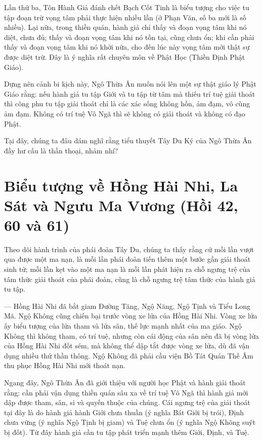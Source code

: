 Lần thứ ba, Tôn Hành Giả đánh chết Bạch Cốt Tinh là biểu tượng cho việc tu tập đoạn trừ vọng tâm phải thực hiện nhiều lần (ở Phạn Văn, số ba mới là số nhiều). Lại nữa, trong thiền quán, hành giả chỉ thấy và đoạn vọng tâm khi nó diệt, chưa đủ; thấy và đoạn vọng tâm khi nó tồn tại, cũng chưa ổn; khi cần phải thấy và đoạn vọng tâm khi nó khởi nữa, cho đến lúc này vọng tâm mới thật sự được diệt trừ. Đây là ý nghĩa rất chuyên môn về Phật Học (Thiền Định Phật Giáo).

Dựng nên cảnh bi kịch này, Ngô Thừa Ân muốn nói lên một sự thật giáo lý Phật Giáo rằng: nếu hành giả tu tập Giới và tu tập từ tâm mà thiếu trí tuệ giải thoát thì công phu tu tập giải thoát chỉ là các xác sống không hồn, ảm đạm, vô cùng ảm đạm. Không có trí tuệ Vô Ngã thì sẽ không có giải thoát và không có đạo Phật.

Tại đây, chúng ta đâu dám nghĩ rằng tiểu thuyết Tây Du Ký của Ngô Thừa Ân đầy hư cấu là thần thoại, nhảm nhí?


\section{Biểu tượng về Hồng Hài Nhi, La Sát và Ngưu Ma Vương (Hồi 42, 60 và 61)} %
\label{sec:bieu_tuong_ve_hong_hai_nhi_va_nguu_ma_vuong}

Theo dõi hành trình của phái đoàn Tây Du, chúng ta thấy rằng cứ mỗi lần vượt qua được một ma nạn, là mỗi lần phái đoàn tiến thêm một bước gần giải thoát sinh tử; mỗi lần kẹt vào một ma nạn là mỗi lần phát hiện ra chỗ ngưng trệ của tâm thức giải thoát của phái đoàn, cũng là chỗ ngưng trệ tâm thức của hành giả tu tập.

— Hồng Hài Nhi đã bắt giam Đường Tăng, Ngộ Năng, Ngộ Tịnh và Tiểu Long Mã. Ngộ Không cũng chiến bại trước vòng xe lửa của Hồng Hài Nhi. Vòng xe lửa ấy biểu tượng của lửa tham và lửa sân, thế lực mạnh nhất của ma giáo. Ngộ Không thì không tham, có trí tuệ, nhưng còn cái động của sân nên đã bị vòng lửa của Hồng Hài Nhi đốt sém, mà không thể dập tắt được vòng xe lửa, dù đã vận dụng nhiều thứ thần thông. Ngộ Không đã phải cầu viện Bồ Tát Quán Thế Âm thu phục Hồng Hài Nhi mới thoát nạn.

Ngang đây, Ngô Thừa Ân đã giới thiệu với người học Phật và hành giải thoát rằng: cần phải vận dụng thiền quán sâu xa về trí tuệ Vô Ngã thì hành giả mới dập được tham, sân, si và quyến thuộc của chúng. Cái ngưng trệ của giải thoát tại đây là do hành giả hành Giới chưa thuần (ý nghĩa Bát Giới bị trói), Định chưa vững (ý nghĩa Ngộ Tịnh bị giam) và Tuệ chưa ổn (ý nghĩa Ngộ Không suýt bị đốt). Từ đây hành giả cần tu tập phát triển mạnh thêm Giới, Định, và Tuệ.

